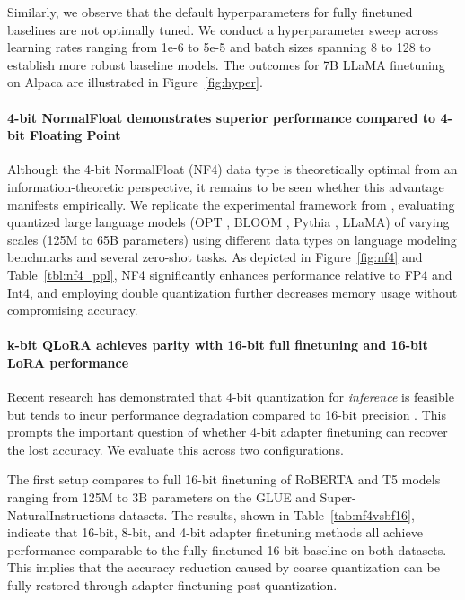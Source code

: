 Similarly, we observe that the default hyperparameters for fully finetuned baselines are not optimally tuned. We conduct a hyperparameter sweep across learning rates ranging from 1e-6 to 5e-5 and batch sizes spanning 8 to 128 to establish more robust baseline models. The outcomes for 7B LLaMA finetuning on Alpaca are illustrated in Figure~\ref{fig:hyper}.

\paragraph{4-bit NormalFloat demonstrates superior performance compared to 4-bit Floating Point}

Although the 4-bit NormalFloat (NF4) data type is theoretically optimal from an information-theoretic perspective, it remains to be seen whether this advantage manifests empirically. We replicate the experimental framework from \citet{dettmers2022case}, evaluating quantized large language models (OPT \citep{zhang2022opt}, BLOOM \cite{scao2022bloom}, Pythia \cite{biderman2023pythia}, LLaMA) of varying scales (125M to 65B parameters) using different data types on language modeling benchmarks and several zero-shot tasks. As depicted in Figure~\ref{fig:nf4} and Table~\ref{tbl:nf4_ppl}, NF4 significantly enhances performance relative to FP4 and Int4, and employing double quantization further decreases memory usage without compromising accuracy.

\paragraph{k-bit \textsc{QLoRA} achieves parity with 16-bit full finetuning and 16-bit LoRA performance} Recent research has demonstrated that 4-bit quantization for \emph{inference} is feasible but tends to incur performance degradation compared to 16-bit precision \citep{dettmers2022case,frantar2022gptq}. This prompts the important question of whether 4-bit adapter finetuning can recover the lost accuracy. We evaluate this across two configurations.

The first setup compares to full 16-bit finetuning of RoBERTA and T5 models ranging from 125M to 3B parameters on the GLUE and Super-NaturalInstructions datasets. The results, shown in Table~\ref{tab:nf4vsbf16}, indicate that 16-bit, 8-bit, and 4-bit adapter finetuning methods all achieve performance comparable to the fully finetuned 16-bit baseline on both datasets. This implies that the accuracy reduction caused by coarse quantization can be fully restored through adapter finetuning post-quantization.

